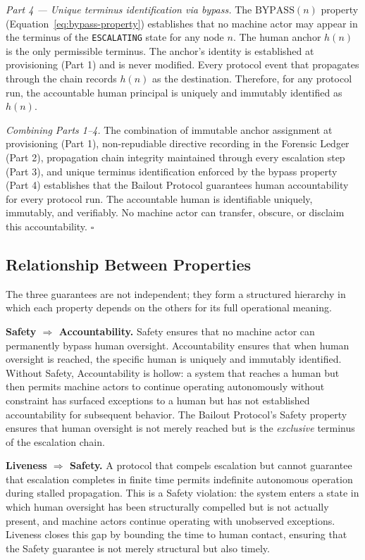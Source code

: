 \medskip
\noindent\textit{Part 4 — Unique terminus identification via bypass.} The $\text{BYPASS}(n)$ property (Equation~\ref{eq:bypass-property}) establishes that no machine actor may appear in the terminus of the \texttt{ESCALATING} state for any node $n$. The human anchor $h(n)$ is the only permissible terminus. The anchor's identity is established at provisioning (Part 1) and is never modified. Every protocol event that propagates through the chain records $h(n)$ as the destination. Therefore, for any protocol run, the accountable human principal is uniquely and immutably identified as $h(n)$.

\medskip
\noindent\textit{Combining Parts 1–4.} The combination of immutable anchor assignment at provisioning (Part 1), non-repudiable directive recording in the Forensic Ledger (Part 2), propagation chain integrity maintained through every escalation step (Part 3), and unique terminus identification enforced by the bypass property (Part 4) establishes that the Bailout Protocol guarantees human accountability for every protocol run. The accountable human is identifiable uniquely, immutably, and verifiably. No machine actor can transfer, obscure, or disclaim this accountability. $\square$

\subsection{Relationship Between Properties}\label{sec:property-relationships}

The three guarantees are not independent; they form a structured hierarchy in which each property depends on the others for its full operational meaning.

\medskip
\noindent\textbf{Safety $\Rightarrow$ Accountability.} Safety ensures that no machine actor can permanently bypass human oversight. Accountability ensures that when human oversight is reached, the specific human is uniquely and immutably identified. Without Safety, Accountability is hollow: a system that reaches a human but then permits machine actors to continue operating autonomously without constraint has surfaced exceptions to a human but has not established accountability for subsequent behavior. The Bailout Protocol's Safety property ensures that human oversight is not merely reached but is the \emph{exclusive} terminus of the escalation chain.

\medskip
\noindent\textbf{Liveness $\Rightarrow$ Safety.} A protocol that compels escalation but cannot guarantee that escalation completes in finite time permits indefinite autonomous operation during stalled propagation. This is a Safety violation: the system enters a state in which human oversight has been structurally compelled but is not actually present, and machine actors continue operating with unobserved exceptions. Liveness closes this gap by bounding the time to human contact, ensuring that the Safety guarantee is not merely structural but also timely.

